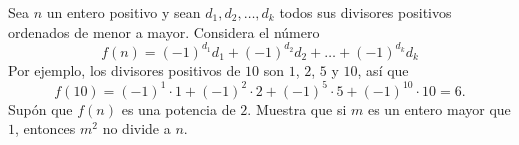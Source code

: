 Sea $n$ un entero positivo y sean $d_1, d_2, \dots , d_k$ todos sus divisores positivos ordenados de
menor a mayor. Considera el número
\[f (n) = (−1)^{d_1} d_1 + (−1)^{d_2} d_2 + \dots + (−1)^{d_k} d_k\]
Por ejemplo, los divisores positivos de $10$ son $1$, $2$, $5$ y $10$, así que
\[f (10) = (−1)^1 \cdot 1 + (−1)^2 \cdot 2 + (−1)^5 \cdot 5 + (−1)^{10} \cdot 10 = 6.\]
Supón que $f (n)$ es una potencia de $2$. Muestra que si $m$ es un entero mayor que $1$, entonces
$m^2$ no divide a $n$.